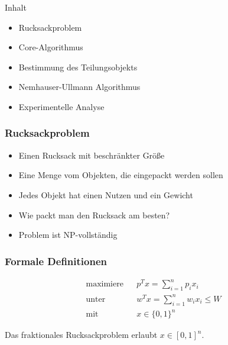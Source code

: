 \documentclass{presentation}
\begin{document}
\begin{frame}
    \titlepage
\end{frame}

\begin{frame}{Inhalt}
    \begin{itemize}
        \item Rucksackproblem
        \item Core-Algorithmus
        \item Bestimmung des Teilungsobjekts
        \item Nemhauser-Ullmann Algorithmus
        \item Experimentelle Analyse
    \end{itemize}
\end{frame}



\begin{frame}
\end{frame}



\begin{frame}
    \frametitle{Rucksackproblem}
    \begin{itemize}
        \item Einen Rucksack mit beschränkter Größe
        \item Eine Menge vom Objekten, die eingepackt werden sollen
        \item Jedes Objekt hat einen Nutzen und ein Gewicht
        \pause

        \item Wie packt man den Rucksack am besten?
        \item Problem ist $\mathrm{NP}$-vollständig
    \end{itemize}
\end{frame}



\begin{frame}
    \frametitle{Formale Definitionen}
    \begin{eqnarray*}
        \text{maximiere} & & p^T x = \sum_{i=1}^n p_i x_i \\
        \text{unter} & & w^T x = \sum_{i=1}^n w_i x_i \leq W \\
        \text{mit} & & x \in \{0,1\}^n
    \end{eqnarray*}
    \pause

    Das fraktionales Rucksackproblem erlaubt $x \in [0,1]^n$.
\end{frame}
\end{document}
